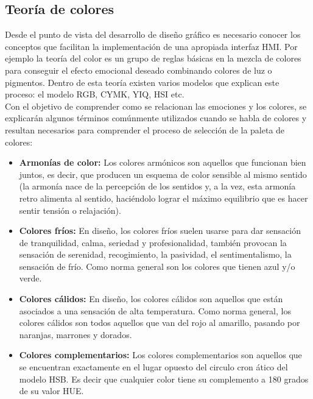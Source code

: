 \subsection{Teoría de colores}

Desde el punto de vista del desarrollo de diseño gráfico es necesario conocer los conceptos que facilitan la implementación de una apropiada interfaz HMI. Por ejemplo la teoría del color es un grupo de reglas básicas en la mezcla de colores para conseguir el efecto emocional deseado combinando colores de luz o pigmentos. Dentro de esta teoría existen varios modelos que explican este proceso: el modelo RGB, CYMK, YIQ, HSI etc.
\vspace{0.5cm}\\
Con el objetivo de comprender como se relacionan las emociones y los colores, se explicarán algunos términos comúnmente utilizados cuando se habla de colores y resultan necesarios para comprender el proceso de selección de la paleta de colores:

\begin{itemize}
	\item\textbf{Armonías de color:} Los colores armónicos son aquellos que funcionan bien juntos, es decir, que producen un esquema de color sensible al mismo sentido (la armonía nace de la percepción de los sentidos y, a la vez, esta armonía retro alimenta al sentido, haciéndolo lograr el máximo equilibrio que es hacer sentir tensión o relajación).
	\item\textbf{Colores fríos:} En diseño, los colores fríos suelen usarse para dar sensación de tranquilidad, calma, seriedad y profesionalidad, también provocan la sensación de serenidad, recogimiento, la pasividad, el sentimentalismo, la sensación de frío. Como norma general son los colores que tienen azul y/o verde.
	\item\textbf{Colores cálidos:} En diseño, los colores cálidos son aquellos que están asociados a una sensación de alta temperatura. Como norma general, los colores cálidos son todos aquellos que van del rojo al amarillo, pasando por naranjas, marrones y dorados.
	\item\textbf{Colores complementarios:} Los colores complementarios son aquellos que se encuentran exactamente en el lugar opuesto del circulo cron ático del modelo HSB. Es decir que cualquier color tiene su complemento a 180 grados de su valor HUE.

\end{itemize}

